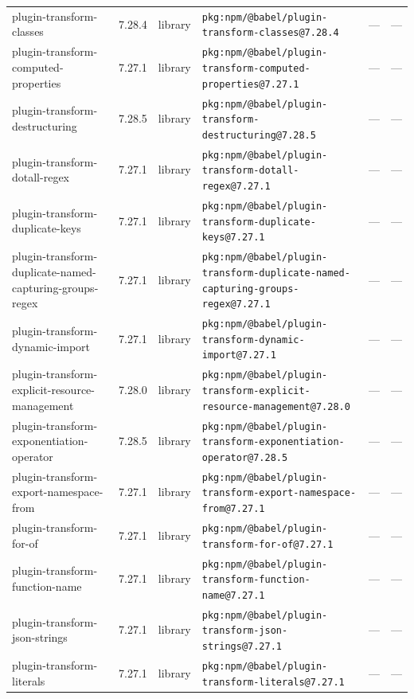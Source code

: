 \documentclass[11pt,a4paper]{article}
\begin{document}
\begin{longtable}{|p{4cm}|p{2cm}|p{1.6cm}|p{5cm}|p{1.5cm}|p{3.5cm}|}
\raggedright plugin-transform-classes & 7.28.4 & library & \small\texttt{pkg:npm/@babel/plugin-transform-classes@7.28.4} & — & \small — \\
\raggedright plugin-transform-computed-properties & 7.27.1 & library & \small\texttt{pkg:npm/@babel/plugin-transform-computed-properties@7.27.1} & — & \small — \\
\raggedright plugin-transform-destructuring & 7.28.5 & library & \small\texttt{pkg:npm/@babel/plugin-transform-destructuring@7.28.5} & — & \small — \\
\raggedright plugin-transform-dotall-regex & 7.27.1 & library & \small\texttt{pkg:npm/@babel/plugin-transform-dotall-regex@7.27.1} & — & \small — \\
\raggedright plugin-transform-duplicate-keys & 7.27.1 & library & \small\texttt{pkg:npm/@babel/plugin-transform-duplicate-keys@7.27.1} & — & \small — \\
\raggedright plugin-transform-duplicate-named-capturing-groups-regex & 7.27.1 & library & \small\texttt{pkg:npm/@babel/plugin-transform-duplicate-named-capturing-groups-regex@7.27.1} & — & \small — \\
\raggedright plugin-transform-dynamic-import & 7.27.1 & library & \small\texttt{pkg:npm/@babel/plugin-transform-dynamic-import@7.27.1} & — & \small — \\
\raggedright plugin-transform-explicit-resource-management & 7.28.0 & library & \small\texttt{pkg:npm/@babel/plugin-transform-explicit-resource-management@7.28.0} & — & \small — \\
\raggedright plugin-transform-exponentiation-operator & 7.28.5 & library & \small\texttt{pkg:npm/@babel/plugin-transform-exponentiation-operator@7.28.5} & — & \small — \\
\raggedright plugin-transform-export-namespace-from & 7.27.1 & library & \small\texttt{pkg:npm/@babel/plugin-transform-export-namespace-from@7.27.1} & — & \small — \\
\raggedright plugin-transform-for-of & 7.27.1 & library & \small\texttt{pkg:npm/@babel/plugin-transform-for-of@7.27.1} & — & \small — \\
\raggedright plugin-transform-function-name & 7.27.1 & library & \small\texttt{pkg:npm/@babel/plugin-transform-function-name@7.27.1} & — & \small — \\
\raggedright plugin-transform-json-strings & 7.27.1 & library & \small\texttt{pkg:npm/@babel/plugin-transform-json-strings@7.27.1} & — & \small — \\
\raggedright plugin-transform-literals & 7.27.1 & library & \small\texttt{pkg:npm/@babel/plugin-transform-literals@7.27.1} & — & \small — \\

\end{longtable}
\end{document}
